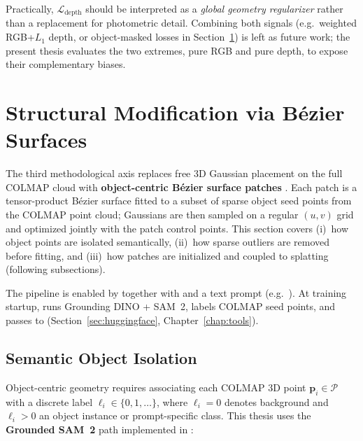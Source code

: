 Practically, $\mathcal{L}_{\mathrm{depth}}$ should be interpreted as a \emph{global geometry regularizer} rather than a replacement for photometric detail. Combining both signals (e.g.\ weighted RGB+$L_1$ depth, or object-masked losses in Section~\ref{sec:bezier_structural}) is left as future work; the present thesis evaluates the two extremes, pure RGB and pure depth, to expose their complementary biases.

\section{Structural Modification via B\'ezier Surfaces}
\label{sec:bezier_structural}

The third methodological axis replaces free 3D Gaussian placement on the full COLMAP cloud with \textbf{object-centric B\'ezier surface patches} \cite{liu2025bezier}. Each patch is a tensor-product B\'ezier surface fitted to a subset of sparse object seed points from the COLMAP point cloud; Gaussians are then sampled on a regular $(u,v)$ grid and optimized jointly with the patch control points. This section covers (i)~how object points are isolated semantically, (ii)~how sparse outliers are removed before fitting, and (iii)~how patches are initialized and coupled to splatting (following subsections).

The pipeline is enabled by  together with  and a text prompt (e.g.\ ). At training startup,  runs Grounding DINO + SAM~2, labels COLMAP seed points, and passes  to  (Section~\ref{sec:huggingface}, Chapter~\ref{chap:tools}).

\subsection{Semantic Object Isolation}
\label{subsec:semantic_isolation}

Object-centric geometry requires associating each COLMAP 3D point $\mathbf{p}_i\in\mathcal{P}$ with a discrete label $\ell_i\in\{0,1,\ldots\}$, where $\ell_i=0$ denotes background and $\ell_i>0$ an object instance or prompt-specific class. This thesis uses the \textbf{Grounded SAM~2} path implemented in :

